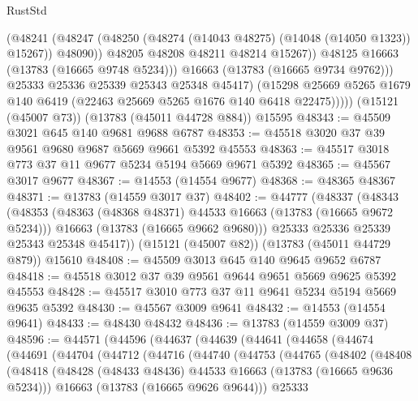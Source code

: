\begin{lexlean}{RustStd}
\begin{coremodule}
                    (@48241
                      (@48247
                        (@48250 (@48274 (@14043 @48275) (@14048 (@14050 @1323)) @15267))
                        @48090))
                    @48205
                    @48208
                    @48211
                    @48214
                    @15267))
                @48125
                @16663
                (@13783 (@16665 @9748 @5234)))
              @16663
              (@13783 (@16665 @9734 @9762)))
            @25333
            @25336
            @25339
            @25343
            @25348
            @45417)
          (@15298 @25669 @5265 @1679 @140 @6419 (@22463 @25669 @5265 @1676 @140 @6418 @22475)))))
    (@15121 (@45007 @73))
    (@13783 (@45011 @44728 @884))
    @15595
@48343 := @45509 @3021 @645 @140 @9681 @9688 @6787
@48353 := @45518 @3020 @37 @39 @9561 @9680 @9687 @5669 @9661 @5392 @45553
@48363 := @45517 @3018 @773 @37 @11 @9677 @5234 @5194 @5669 @9671 @5392
@48365 := @45567 @3017 @9677
@48367 := @14553 (@14554 @9677)
@48368 := @48365 @48367
@48371 := @13783 (@14559 @3017 @37)
@48402 := @44777
    (@48337
      (@48343
        (@48353
          (@48363 (@48368 @48371) @44533 @16663 (@13783 (@16665 @9672 @5234)))
          @16663
          (@13783 (@16665 @9662 @9680)))
        @25333
        @25336
        @25339
        @25343
        @25348
        @45417))
    (@15121 (@45007 @82))
    (@13783 (@45011 @44729 @879))
    @15610
@48408 := @45509 @3013 @645 @140 @9645 @9652 @6787
@48418 := @45518 @3012 @37 @39 @9561 @9644 @9651 @5669 @9625 @5392 @45553
@48428 := @45517 @3010 @773 @37 @11 @9641 @5234 @5194 @5669 @9635 @5392
@48430 := @45567 @3009 @9641
@48432 := @14553 (@14554 @9641)
@48433 := @48430 @48432
@48436 := @13783 (@14559 @3009 @37)
@48596 := @44571
    (@44596
      (@44637
        (@44639
          (@44641
            (@44658
              (@44674
                (@44691
                  (@44704
                    (@44712
                      (@44716
                        (@44740
                          (@44753
                            (@44765
                              (@48402
                                (@48408
                                  (@48418
                                    (@48428
                                      (@48433 @48436)
                                      @44533
                                      @16663
                                      (@13783 (@16665 @9636 @5234)))
                                    @16663
                                    (@13783 (@16665 @9626 @9644)))
                                  @25333

\end{coremodule}
\end{lexlean}

